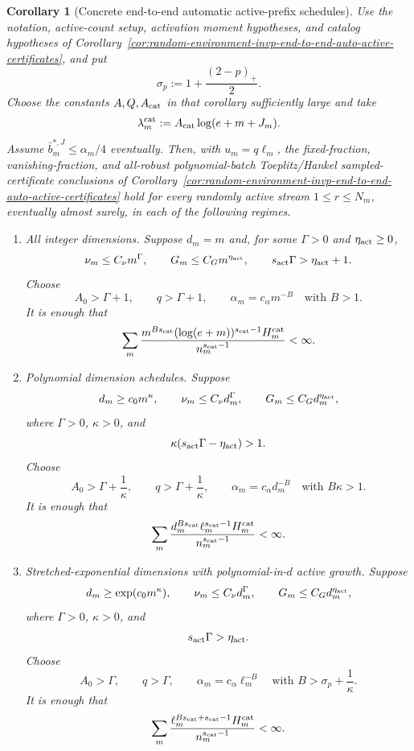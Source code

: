 \documentclass[11pt]{amsart}
\numberwithin{equation}{section}
\newtheorem{corollary}[theorem]{Corollary}
\theoremstyle{definition}
\theoremstyle{remark}
\begin{document}
\begin{corollary}[Concrete end-to-end automatic active-prefix schedules]
\label{cor:random-environment-invp-end-to-end-auto-active-schedules}
Use the notation, active-count setup, activation moment hypotheses, and catalog
hypotheses of
Corollary~\ref{cor:random-environment-invp-end-to-end-auto-active-certificates},
and put
\[
  \sigma_p:=1+\frac{(2-p)_+}{2}.
\]
Choose the constants \(A,Q,A_{\rm cat}\) in that corollary sufficiently large
and take
\[
  \lambda_m^{\rm cat}:=A_{\rm cat}\log(e+m+J_m).
\]
Assume \(\bar b_m^{*,J}\le\alpha_m/4\) eventually.  Then, with
\(u_m=q\ell_m\), the fixed-fraction, vanishing-fraction, and all-robust
polynomial-batch Toeplitz/Hankel sampled-certificate conclusions of
Corollary~\ref{cor:random-environment-invp-end-to-end-auto-active-certificates}
hold for every randomly active stream \(1\le r\le N_m\), eventually almost
surely, in each of the following regimes.

\begin{enumerate}[label=\textup{(\roman*)},leftmargin=2.2em]
\item All integer dimensions.  Suppose \(d_m=m\) and, for some
\(\Gamma>0\) and \(\eta_{\rm act}\ge0\),
\[
  \nu_m\le C_\nu m^\Gamma,\qquad
  G_m\le C_G m^{\eta_{\rm act}},\qquad
  s_{\rm act}\Gamma>\eta_{\rm act}+1 .
\]
Choose
\[
  A_0>\Gamma+1,\qquad q>\Gamma+1,\qquad
  \alpha_m=c_\alpha m^{-B}\quad\text{with }B>1 .
\]
It is enough that
\[
  \sum_m
  \frac{m^{Bs_{\rm cat}}(\log(e+m))^{s_{\rm cat}-1}H_m^{\rm cat}}
       {n_m^{s_{\rm cat}-1}}<\infty .
\]

\item Polynomial dimension schedules.  Suppose
\[
  d_m\ge c_0m^\kappa,\qquad
  \nu_m\le C_\nu d_m^\Gamma,\qquad
  G_m\le C_G d_m^{\eta_{\rm act}},
\]
where \(\Gamma>0\), \(\kappa>0\), and
\[
  \kappa(s_{\rm act}\Gamma-\eta_{\rm act})>1 .
\]
Choose
\[
  A_0>\Gamma+\frac1\kappa,\qquad
  q>\Gamma+\frac1\kappa,\qquad
  \alpha_m=c_\alpha d_m^{-B}\quad\text{with }B\kappa>1 .
\]
It is enough that
\[
  \sum_m
  \frac{d_m^{Bs_{\rm cat}}\ell_m^{s_{\rm cat}-1}H_m^{\rm cat}}
       {n_m^{s_{\rm cat}-1}}<\infty .
\]

\item Stretched-exponential dimensions with polynomial-in-\(d\) active
growth.  Suppose
\[
  d_m\ge\exp(c_0m^\kappa),\qquad
  \nu_m\le C_\nu d_m^\Gamma,\qquad
  G_m\le C_G d_m^{\eta_{\rm act}},
\]
where \(\Gamma>0\), \(\kappa>0\), and
\[
  s_{\rm act}\Gamma>\eta_{\rm act}.
\]
Choose
\[
  A_0>\Gamma,\qquad q>\Gamma,\qquad
  \alpha_m=c_\alpha\ell_m^{-B}
  \quad\text{with } B>\sigma_p+\frac1\kappa .
\]
It is enough that
\[
  \sum_m
  \frac{\ell_m^{Bs_{\rm cat}+s_{\rm cat}-1}H_m^{\rm cat}}
       {n_m^{s_{\rm cat}-1}}<\infty .
\]


\end{enumerate}
\end{corollary}
\end{document}

